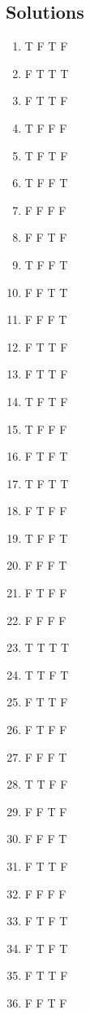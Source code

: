 \documentclass[10pt,a4paper]{article}
\begin{document}
\subsection{Solutions}
\begin{enumerate}[label=\textbf{\arabic*})]
\item T F T F
\item F T T T
\item F T T F
\item T F F F
\item T F T F
\item T F F T
\item F F F F
\item F F T F
\item T F F T
\item F F T T
\item F F F T
\item F T T F
\item F T T F
\item T F T F
\item T F F F
\item F T F T
\item T F T T
\item F T F F
\item T F F T
\item F F F T
\item F T F F
\item F F F F
\item T T T T
\item T T F T
\item F T T F
\item F T F F
\item F F F T
\item T T F F
\item F F T F
\item F F F T
\item F T T F
\item F F F F
\item F T F T
\item F T F T
\item F T T F
\item F F T F
\end{enumerate}
\end{document}

